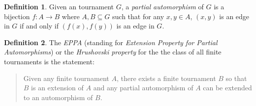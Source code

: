 \documentclass[10pt,a4paper]{amsart}
\newtheorem{theorem}{Theorem}[section]
\theoremstyle{definition}
\newtheorem{definition}[theorem]{Definition}
\newtheorem{problem}[theorem]{Problem}
\theoremstyle{definition}
\numberwithin{equation}{section}
\begin{document}
\begin{definition} Given an tournament $G$, a {\em partial automorphism} of $G$ is a bijection $f\colon A\to B$ where $A, B\subseteq G$ such that for any $x, y\in A$, $(x, y)$ is an edge in $G$ if and only if $(f(x), f(y))$ is an edge in $G$.
\end{definition}

\begin{definition} The {\em EPPA} (standing for {\em Extension Property for Partial Automorphisms}) or the {\em Hrushovski property} for the the class of all finite tournaments is the statement:
\begin{quote}
 Given any finite tournament $A$, there exists a finite tournament $B$ so that $B$ is an extension of $A$ and any partial automorphism of $A$ can be extended to an automorphism of $B$.
 \end{quote}
 \end{definition}
\end{document}
